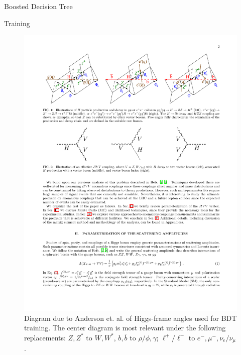 \begin{section}{Boosted Decision Tree}
\begin{subsection}{Training}
\begin{figure}[htb]
\begin{center}
\includegraphics[width=.95\linewidth]{Dissertation/fig/magic-angles.pdf}
\end{center}
\caption{Diagram due to Anderson et. al. \cite{magic-angles-cite} of Higgs-frame angles used for BDT training. The center diagram is most relevant under the following replacements: $Z, Z^*$ to $W, W^*$, $b, \bar{b}$ to $\rho/\phi, \gamma$; $\ell^+/\ell^-$ to $e^-,\mu^-, \nu_e/ \nu_\mu$.}
\label{fig:magic-angles}
\end{figure}


\end{subsection}
\end{section}

